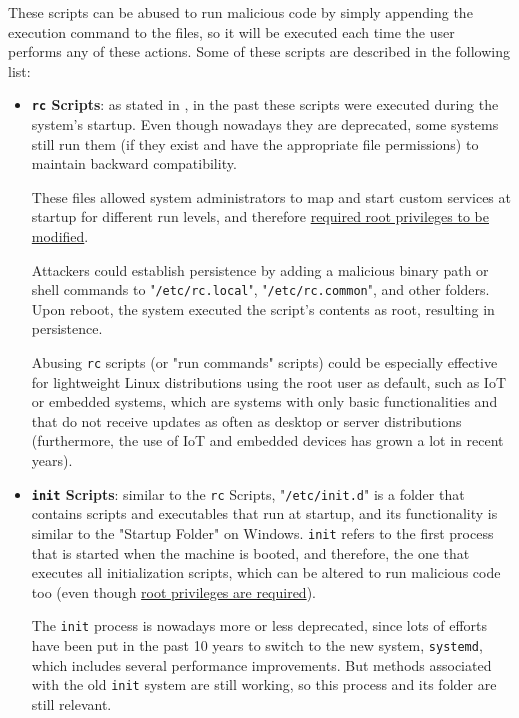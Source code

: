 \begin{itemize}
\pagebreak
These scripts can be abused to run malicious code by simply appending the execution command to the files, so it will be executed each time the user performs any of these actions. Some of these scripts are described in the following list:

\begin{itemize}
\item \textbf{\texttt{rc} Scripts}: as stated in \cite{MitreRC}, in the past these scripts were executed during the system’s startup. Even though nowadays they are deprecated, some systems still run them (if they exist and have the appropriate file permissions) to maintain backward compatibility.

These files allowed system administrators to map and start custom services at startup for different run levels, and therefore \underline{required root privileges to be modified}.

Attackers could establish persistence by adding a malicious binary path or shell commands to "\verb|/etc/rc.local|", "\verb|/etc/rc.common|", and other folders. Upon reboot, the system executed the script's contents as root, resulting in persistence.

Abusing \texttt{rc} scripts (or "run commands" scripts) could be especially effective for lightweight Linux distributions using the root user as default, such as IoT or embedded systems, which are systems with only basic functionalities and that do not receive updates as often as desktop or server distributions (furthermore, the use of IoT and embedded devices has grown a lot in recent years).

\item \textbf{\texttt{init} Scripts}: similar to the \texttt{rc} Scripts, "\verb|/etc/init.d|" is a folder that contains scripts and executables that run at startup, and its functionality is similar to the "Startup Folder" on Windows. \texttt{init} refers to the first process that is started when the machine is booted, and therefore, the one that executes all initialization scripts, which can be altered to run malicious code too (even though \underline{root privileges are required}).

The \texttt{init} process is nowadays more or less deprecated, since lots of efforts have been put in the past 10 years to switch to the new system, \texttt{systemd}, which includes several performance improvements. But methods associated with the old \texttt{init} system are still working, so this process and its folder are still relevant.


\end{itemize}
\end{itemize}
